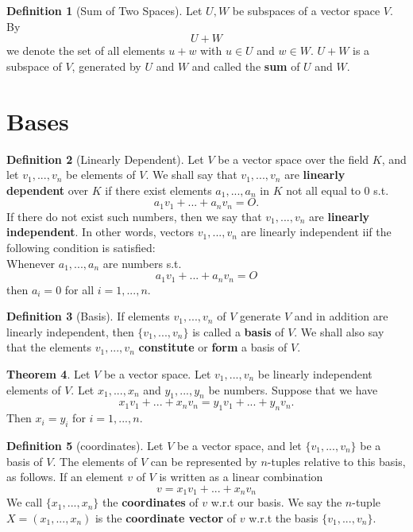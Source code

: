 \documentclass{book}
\theoremstyle{definition}
\newtheorem{definition}{Definition}[section]
\newtheorem{theorem}[definition]{Theorem}
\begin{document}
\begin{definition}[Sum of Two Spaces]
    Let $U, W$ be subspaces of a vector space $V$. By
    \begin{equation*}
        U + W
    \end{equation*}
    we denote the set of all elements $u +w $ with $u \in U$ and $w \in W$. $U + W$ is a subspace of $V$, generated by $U$ and $W$ and called the \textbf{sum} of $U$ and $W$.
\end{definition}
\section{Bases}
\begin{definition}[Linearly Dependent]
    Let $V$ be a vector space over the field $K$, and let $v_1,...,v_n$ be elements of $V$. We shall say that $v_1,...,v_n$ are \textbf{linearly dependent} over $K$ if there exist elements $a_1,...,a_n$ in $K$ not all equal to 0 s.t.
    \begin{equation*}
        a_1 v_1 + ... + a_n v_n = O.
    \end{equation*}
    If there do not exist such numbers, then we say that $v_1,...,v_n$ are \textbf{linearly independent}. In other words, vectors $v_1, ..., v_n$ are linearly independent iif the following condition is satisfied:
    \\ Whenever $a_1,...,a_n$ are numbers s.t.
    \begin{equation*}
        a_1 v_1 + ... + a_n v_n = O
    \end{equation*}
    then $a_i = 0$ for all $i=1,...,n$.
\end{definition}
\begin{definition}[Basis]
    If elements $v_1,...,v_n$ of $V$ generate $V$ and in addition are linearly independent, then $\{v_1,...,v_n\}$ is called a \textbf{basis} of $V$. We shall also say that the elements $v_1,...,v_n$ \textbf{constitute} or \textbf{form} a basis of $V$.
\end{definition}
\begin{theorem}
Let $V$ be a vector space. Let $v_1, ..., v_n$ be linearly independent elements of $V$. Let $x_1,...,x_n$ and $y_1,...,y_n$ be numbers. Suppose that we have 
\begin{equation*}
    x_1v_1 + ... + x_nv_n = y_1v_1 + ... + y_n v_n.
\end{equation*}
Then $x_i = y_i$ for $i = 1,...,n$.
\end{theorem}
\begin{definition}[coordinates]
    Let $V$ be a vector space, and let $\{v_1, ..., v_n\}$ be a basis of $V$. The elements of $V$ can be represented by $n$-tuples relative to this basis, as follows. If an element $v$ of $V$ is written as a linear combination
    \begin{equation*}
        v = x_1 v_1 + ... + x_n v_n
    \end{equation*}
    We call $\{x_1, ..., x_n\}$ the \textbf{coordinates} of $v$ w.r.t our basis. We say the $n$-tuple $X = (x_1,...,x_n)$ is the \textbf{coordinate vector} of $v$ w.r.t the basis $\{v_1, ..., v_n\}$.
\end{definition}
\end{document}
